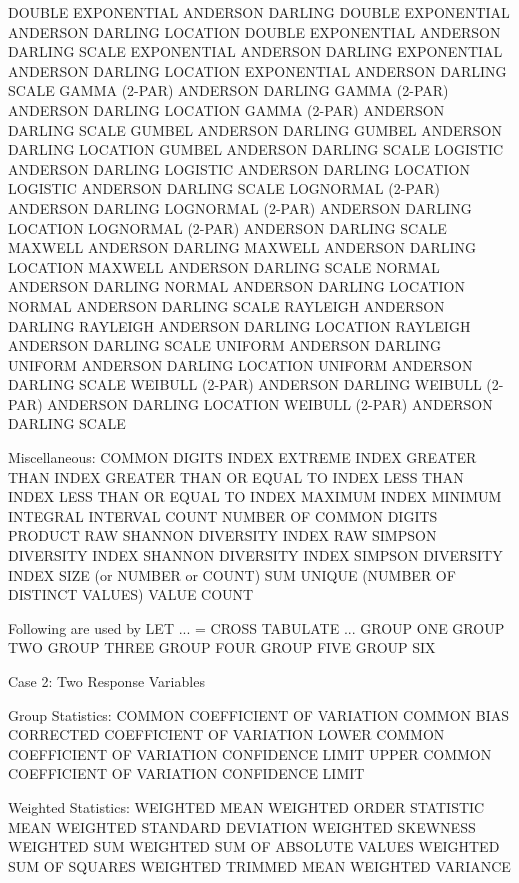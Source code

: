    DOUBLE EXPONENTIAL ANDERSON DARLING
   DOUBLE EXPONENTIAL ANDERSON DARLING LOCATION
   DOUBLE EXPONENTIAL ANDERSON DARLING SCALE
   EXPONENTIAL        ANDERSON DARLING
   EXPONENTIAL        ANDERSON DARLING LOCATION
   EXPONENTIAL        ANDERSON DARLING SCALE
   GAMMA (2-PAR)      ANDERSON DARLING
   GAMMA (2-PAR)      ANDERSON DARLING LOCATION
   GAMMA (2-PAR)      ANDERSON DARLING SCALE
   GUMBEL             ANDERSON DARLING
   GUMBEL             ANDERSON DARLING LOCATION
   GUMBEL             ANDERSON DARLING SCALE
   LOGISTIC           ANDERSON DARLING
   LOGISTIC           ANDERSON DARLING LOCATION
   LOGISTIC           ANDERSON DARLING SCALE
   LOGNORMAL (2-PAR)  ANDERSON DARLING
   LOGNORMAL (2-PAR)  ANDERSON DARLING LOCATION
   LOGNORMAL (2-PAR)  ANDERSON DARLING SCALE
   MAXWELL            ANDERSON DARLING
   MAXWELL            ANDERSON DARLING LOCATION
   MAXWELL            ANDERSON DARLING SCALE
   NORMAL             ANDERSON DARLING
   NORMAL             ANDERSON DARLING LOCATION
   NORMAL             ANDERSON DARLING SCALE
   RAYLEIGH           ANDERSON DARLING
   RAYLEIGH           ANDERSON DARLING LOCATION
   RAYLEIGH           ANDERSON DARLING SCALE
   UNIFORM            ANDERSON DARLING
   UNIFORM            ANDERSON DARLING LOCATION
   UNIFORM            ANDERSON DARLING SCALE
   WEIBULL (2-PAR)    ANDERSON DARLING
   WEIBULL (2-PAR)    ANDERSON DARLING LOCATION
   WEIBULL (2-PAR)    ANDERSON DARLING SCALE

Miscellaneous:
   COMMON DIGITS
   INDEX EXTREME
   INDEX GREATER THAN
   INDEX GREATER THAN OR EQUAL TO
   INDEX LESS THAN
   INDEX LESS THAN OR EQUAL TO
   INDEX MAXIMUM
   INDEX MINIMUM
   INTEGRAL
   INTERVAL COUNT
   NUMBER OF COMMON DIGITS
   PRODUCT
   RAW SHANNON DIVERSITY INDEX
   RAW SIMPSON DIVERSITY INDEX
   SHANNON DIVERSITY INDEX
   SIMPSON DIVERSITY INDEX
   SIZE (or NUMBER or COUNT)
   SUM
   UNIQUE (NUMBER OF DISTINCT VALUES)
   VALUE COUNT

Following are used by  LET ... = CROSS TABULATE ...
   GROUP ONE
   GROUP TWO
   GROUP THREE
   GROUP FOUR
   GROUP FIVE
   GROUP SIX

Case 2: Two Response Variables

Group Statistics:
   COMMON COEFFICIENT OF VARIATION
   COMMON BIAS CORRECTED COEFFICIENT OF VARIATION
   LOWER COMMON COEFFICIENT OF VARIATION CONFIDENCE LIMIT
   UPPER COMMON COEFFICIENT OF VARIATION CONFIDENCE LIMIT

Weighted Statistics:
   WEIGHTED MEAN
   WEIGHTED ORDER STATISTIC MEAN
   WEIGHTED STANDARD DEVIATION
   WEIGHTED SKEWNESS
   WEIGHTED SUM
   WEIGHTED SUM OF ABSOLUTE VALUES
   WEIGHTED SUM OF SQUARES
   WEIGHTED TRIMMED MEAN
   WEIGHTED VARIANCE

